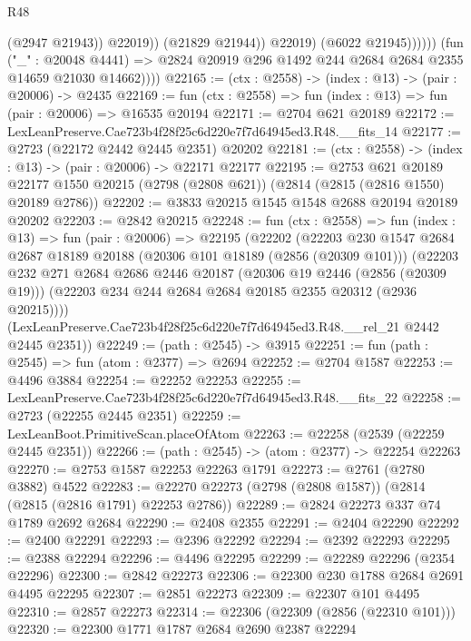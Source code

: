 \begin{lexlean}{R48}
\begin{coremodule}
                              (@2947 @21943))
                            @22019))
                        (@21829 @21944))
                      @22019)
                    (@6022 @21945))))))
          (fun ("_" : @20048 @4441) =>
          @2824 @20919 @296 @1492 @244 @2684 @2684 @2355 @14659 @21030 @14662))))
@22165 := (ctx : @2558) -> (index : @13) -> (pair : @20006) -> @2435
@22169 := fun (ctx : @2558) => fun (index : @13) => fun (pair : @20006) => @16535 @20194
@22171 := @2704 @621 @20189
@22172 := LexLeanPreserve.Cae723b4f28f25c6d220e7f7d64945ed3.R48.__fits_14
@22177 := @2723 (@22172 @2442 @2445 @2351) @20202
@22181 := (ctx : @2558) -> (index : @13) -> (pair : @20006) -> @22171 @22177
@22195 := @2753
    @621
    @20189
    @22177
    @1550
    @20215
    (@2798 (@2808 @621))
    (@2814 (@2815 (@2816 @1550) @20189 @2786))
@22202 := @3833 @20215 @1545 @1548 @2688 @20194 @20189 @20202
@22203 := @2842 @20215
@22248 := fun (ctx : @2558) =>
  fun (index : @13) =>
  fun (pair : @20006) =>
  @22195
    (@22202
      (@22203
        @230
        @1547
        @2684
        @2687
        @18189
        @20188
        (@20306 @101 @18189 (@2856 (@20309 @101)))
        (@22203
          @232
          @271
          @2684
          @2686
          @2446
          @20187
          (@20306 @19 @2446 (@2856 (@20309 @19)))
          (@22203 @234 @244 @2684 @2684 @20185 @2355 @20312 (@2936 @20215))))
      (LexLeanPreserve.Cae723b4f28f25c6d220e7f7d64945ed3.R48.__rel_21 @2442 @2445 @2351))
@22249 := (path : @2545) -> @3915
@22251 := fun (path : @2545) => fun (atom : @2377) => @2694
@22252 := @2704 @1587
@22253 := @4496 @3884
@22254 := @22252 @22253
@22255 := LexLeanPreserve.Cae723b4f28f25c6d220e7f7d64945ed3.R48.__fits_22
@22258 := @2723 (@22255 @2445 @2351)
@22259 := LexLeanBoot.PrimitiveScan.placeOfAtom
@22263 := @22258 (@2539 (@22259 @2445 @2351))
@22266 := (path : @2545) -> (atom : @2377) -> @22254 @22263
@22270 := @2753 @1587 @22253 @22263 @1791
@22273 := @2761 (@2780 @3882) @4522
@22283 := @22270 @22273 (@2798 (@2808 @1587)) (@2814 (@2815 (@2816 @1791) @22253 @2786))
@22289 := @2824 @22273 @337 @74 @1789 @2692 @2684
@22290 := @2408 @2355
@22291 := @2404 @22290
@22292 := @2400 @22291
@22293 := @2396 @22292
@22294 := @2392 @22293
@22295 := @2388 @22294
@22296 := @4496 @22295
@22299 := @22289 @22296 (@2354 @22296)
@22300 := @2842 @22273
@22306 := @22300 @230 @1788 @2684 @2691 @4495 @22295
@22307 := @2851 @22273
@22309 := @22307 @101 @4495
@22310 := @2857 @22273
@22314 := @22306 (@22309 (@2856 (@22310 @101)))
@22320 := @22300 @1771 @1787 @2684 @2690 @2387 @22294

\end{coremodule}
\end{lexlean}
